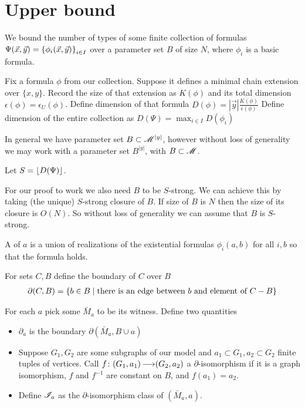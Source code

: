 \section{Upper bound}

We bound the number of types of some finite collection of formulas $\Psi(\vec x, \vec y) = \left\{\phi_i(\vec x, \vec y)\right\}_{i\in I}$ over a parameter set $B$ of size $N$,
where $\phi_i$ is a basic formula.

Fix a formula $\phi$ from our collection.
Suppose it defines a minimal chain extension over $\{x, y\}$. 
Record the size of that extension as $K(\phi)$ and its total dimension $\epsilon(\phi) = \epsilon_U(\phi)$.
Define dimension of that formula $D(\phi) = |\vec y| \frac{K(\phi)}{\epsilon(\phi)}$
Define dimension of the entire collection as $D(\Psi) = \max_{i \in I} D(\phi_i)$

In general we have parameter set $B \subset \mathscr M^{|y|}$, however without loss of generality we may work with
a parameter set $B^{|y|}$, with $B \subset \mathscr M$.

Let $S = \left \lfloor D(\Psi) \right \rfloor$.

For our proof to work we also need $B$ to be $S$-strong.
We can achieve this by taking (the unique) $S$-strong closure of $B$.
If size of $B$ is $N$ then the size of its closure is $O(N)$.	%
So without loss of generality we can assume that $B$ is $S$-strong.

\begin{Definition}
  A  of $a$ is a union of realizations of the existential formulas $\phi_i(a, b)$ for all $i, b$ so that the formula holds.
\end{Definition}

\begin{Definition}
  For sets $C, B$ define the boundary of $C$ over $B$
  \begin{align*}
    \partial(C, B) = \left\{b \in B \mid \text{there is an edge between $b$ and element of $C - B$}\right\}
  \end{align*}
\end{Definition}

\begin{Definition}
  For each $a$ pick some $\bar M_a$ to be its witness.
  Define two quantities
  \begin{itemize}
  \item $\partial_a$ is the boundary $\partial(\bar M_a, B \cup a)$
  \item Suppose $G_1, G_2$ are some subgraphs of our model and $a_1 \subset G_1, a_2 \subset G_2$ finite tuples of vertices.
    Call $f \colon (G_1, a_1) \operatorname{\longrightarrow} (G_2, a_2)$ a $\partial$-isomorphism if it is a graph isomorphism,
    $f$ and $f^{-1}$ are constant on $B$, and
    $f(a_1) = a_2$.
  \item Define $\mathscr I_a$ as the $\partial$-isomorphism class of $(\bar M_a, a)$.
  \end{itemize}
\end{Definition}

